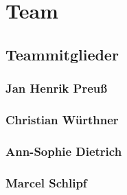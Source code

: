 \chapter{Team}

\section{Teammitglieder}

\subsection*{Jan Henrik Preuß}

\subsection*{Christian Würthner}

\subsection*{Ann-Sophie Dietrich}

\subsection*{Marcel Schlipf}